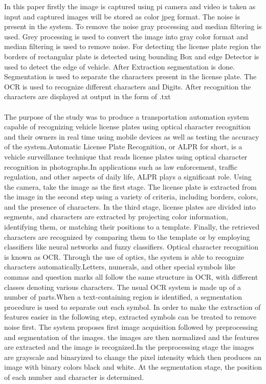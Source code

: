 In this paper firstly the image is captured using pi camera and video is taken as input and captured images will be stored as color jpeg format. The noise is present in the system. To remove the noise gray processing and median filtering is used. Grey processing is used to convert the image into gray color format and median filtering is used to remove noise. For detecting the license plate region the borders of rectangular plate is detected using bounding Box and edge Detector is used to detect the edge of vehicle. After Extraction segmentation is done. Segmentation is used to separate the characters present in the license plate. The OCR is used to recognize different characters and Digits. After recognition the characters are displayed at output in the form of .txt
\\
\\
\big[5\big]The purpose of the study was to produce a transportation automation system capable of recognizing vehicle license plates using optical character recognition and their owners in real time using mobile devices as well as testing the accuracy of the system.Automatic License Plate Recognition, or ALPR for short, is a vehicle surveillance technique that reads license plates using optical character recognition in photographs.In applications such as law enforcement, traffic regulation, and other aspects of daily life, ALPR plays a significant role.
Using the camera, take the image as the first stage. The license plate is extracted from the image in the second step using a variety of criteria, including borders, colors, and the presence of characters.
In the third stage, license plates are divided into segments, and characters are extracted by projecting color information, identifying them, or matching their positions to a template. Finally, the retrieved characters are recognized by comparing them to the template or by employing classifiers like neural networks and fuzzy classifiers.
Optical character recognition is known as OCR. Through the use of optics, the system is able to recognize characters automatically.Letters, numerals, and other special symbols like commas and question marks all follow the same structure in OCR, with different classes denoting various characters. The usual OCR system is made up of a number of parts.When a text-containing region is identified, a segmentation procedure is used to separate out each symbol. In order to make the extraction of features easier in the following step, extracted symbols can be treated to remove noise first. The system proposes first image acquisition followed by preprocessing and segmentation of the images. the images are then normalized and the features are extracted and the image is recognized.In the preprocessing stage the images are grayscale and binaryized to change the pixel intensity which then produces an image with binary colors black and white. At the segmentation stage, the position of each number and character is determined.

